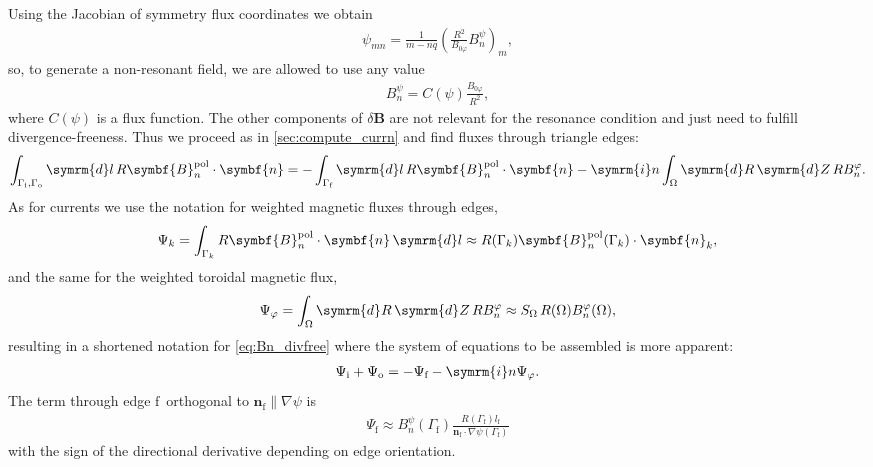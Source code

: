 \documentclass[a4paper, 10pt, english]{article}
\let\temp\varrho
\let\varrho\rho
\let\rho\temp
\let\temp\vartheta
\let\vartheta\theta
\let\theta\temp
\let\temp\varphi
\let\varphi\phi
\let\phi\temp
\let\vec\symbf
\newcommand*\diff{\ensuremath{\symrm{d}}}  %
\newcommand*\im{\ensuremath{\symrm{i}}}  %
\newcommand*\pol{\ensuremath{\textrm{pol}}}  %
\newcommand*\fs{\ensuremath{\textrm{f}}}  %
\newcommand*\inw{\ensuremath{\textrm{i}}}  %
\newcommand*\out{\ensuremath{\textrm{o}}}  %
\begin{document}
Using the Jacobian of symmetry flux coordinates we obtain
\begin{gather*}
  \psi_{m n} = \frac{1}{m - n q} \left( \frac{R^{2}}{B_{0 \phi}} B_{n}^{\psi} \right)_{m},
\end{gather*}
so, to generate a non-resonant field, we are allowed to use any value
\begin{gather*}
  B_{n}^{\psi} = C(\psi) \frac{B_{0 \phi}}{R^{2}},
\end{gather*}
where $C(\psi)$ is a flux function. The other components of $\delta \vec{B}$ are not relevant for the resonance condition and just need to fulfill divergence-freeness. Thus we proceed as in \cref{sec:compute_currn} and find fluxes through triangle edges:
\begin{gather}
  \int_{\Gamma_{\inw}, \Gamma_{\out}} \diff l \, R \vec{B}_{n}^{\pol} \cdot \vec{n} = -\int_{\Gamma_{\fs}} \diff l \, R \vec{B}_{n}^{\pol} \cdot \vec{n} - \im n \int_{\Omega} \diff R \, \diff Z \, R B_{n}^{\phi}. \label{eq:Bn_divfree}
\end{gather}
As for currents we use the notation for weighted magnetic fluxes through edges,
\begin{gather}
  \Psi_{k} = \int_{\Gamma_{k}} R \vec{B}_{n}^{\pol} \cdot \vec{n} \, \diff l \approx R (\Gamma_{k}) \vec{B}_{n}^{\pol} (\Gamma_{k}) \cdot \vec{n}_{k},
\end{gather}
and the same for the weighted toroidal magnetic flux,
\begin{gather}
  \Psi_{\phi} = \int_{\Omega} \diff R \, \diff Z \, R B_{n}^{\phi} \approx S_{\Omega} \, R (\Omega) B_{n}^{\phi} (\Omega),
\end{gather}
resulting in a shortened notation for \cref{eq:Bn_divfree} where the system of equations to be assembled is more apparent:
\begin{gather}
  \Psi_{\inw} + \Psi_{\out} = -\Psi_{\fs} - \im n \Psi_{\phi}.
\end{gather}
The term through edge \fs\ orthogonal to $\vec{n}_{\fs} \parallel \nabla \psi$ is
\begin{gather}
  \Psi_{\fs} \approx B_{n}^{\psi} (\Gamma_{\fs}) \frac{R (\Gamma_{\fs}) l_{\fs}}{\vec{n}_{\fs} \cdot \nabla \psi (\Gamma_{\fs})} \label{eq:Psi_f}
\end{gather}
with the sign of the directional derivative depending on edge orientation.
\end{document}
